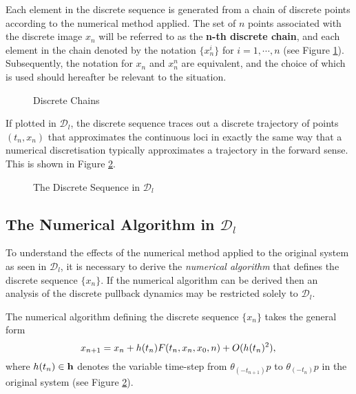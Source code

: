 Each element in the discrete sequence is generated from a chain of discrete
points according to the numerical method applied.  The set of $n$ points
associated with the discrete image $x_n$ will be referred to as the {\bf n-th
discrete chain}, and each element in the chain denoted by the notation
$\{ x_n^i \}$ for $i =1, \cdots, n$ (see Figure
\ref{locinum1}). Subsequently, the notation for $x_n$ and $x_n^n$ are
equivalent, and the choice of which is used should hereafter be relevant to the
situation.

\begin{figure}[h]
\begin{center}
 \caption{Discrete Chains}
\protect\label{locinum1}
\end{center}
\end{figure}

If plotted in $\mathcal{D}_l$, the discrete sequence traces out a discrete
trajectory of points $(t_n, x_n)$ that approximates the continuous loci in
exactly the same way that a numerical discretisation typically approximates a
trajectory in the forward sense. This is shown in Figure \ref{pdisc1}.

\begin{figure}[h]
\begin{center}
 \caption{The Discrete Sequence in $\mathcal{D}_l$}
\protect\label{pdisc1}
\end{center}
\end{figure}

\subsection{The Numerical Algorithm in $\mathcal{D}_l$}

To understand the effects of the numerical method applied to the original system
as seen in $\mathcal{D}_l$, it is necessary to derive the \textit{numerical
algorithm} that defines the discrete sequence $\{x_n\}$. If the numerical
algorithm can be derived then an analysis of the discrete pullback dynamics may
be restricted solely to  $\mathcal{D}_l$.

The numerical algorithm defining the discrete sequence $\{x_n\}$ takes the
general form
\begin{equation} \label{eqnumalg}
 x_{n+1} = x_n + h(t_n)F(t_n, x_n, x_0, n) + O(h(t_n)^2), \\
\end{equation}
where $h(t_n) \in {\bf h}$ denotes the variable time-step from
$\theta_{(-t_{n+1})}p$ to $\theta_{(-t_{n})}p$ in the original system (see
Figure \ref{pdisc1}).

